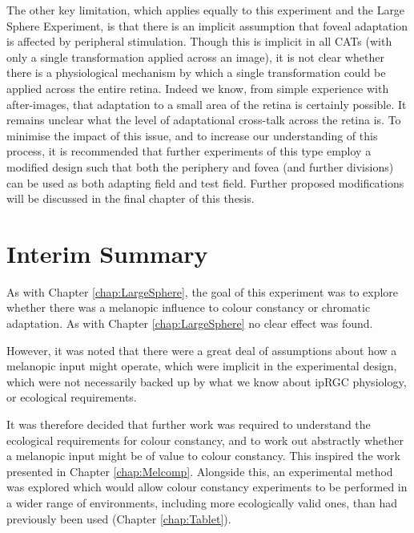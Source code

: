 The other key limitation, which applies equally to this experiment and the Large Sphere Experiment, is that there is an implicit assumption that foveal adaptation is affected by peripheral stimulation. Though this is implicit in all \glspl{CAT} (with only a single transformation applied across an image), it is not clear whether there is a physiological mechanism by which a single transformation could be applied across the entire retina. Indeed we know, from simple experience with after-images, that adaptation to a small area of the retina is certainly possible. It remains unclear what the level of adaptational cross-talk across the retina is. To minimise the impact of this issue, and to increase our understanding of this process, it is recommended that further experiments of this type employ a modified design such that both the periphery and fovea (and further divisions) can be used as both adapting field and test field. Further proposed modifications will be discussed in the final chapter of this thesis.

\section{Interim Summary}

As with Chapter \ref{chap:LargeSphere}, the goal of this experiment was to explore whether there was a melanopic influence to colour constancy or chromatic adaptation. As with Chapter \ref{chap:LargeSphere} no clear effect was found.

However, it was noted that there were a great deal of assumptions about how a melanopic input might operate, which were implicit in the experimental design, which were not necessarily backed up by what we know about \gls{ipRGC} physiology, or ecological requirements. 

It was therefore decided that further work was required to understand the ecological requirements for colour constancy, and to work out abstractly whether a melanopic input might be of value to colour constancy. This inspired the work presented in Chapter \ref{chap:Melcomp}. Alongside this, an experimental method was explored which would allow colour constancy experiments to be performed in a wider range of environments, including more ecologically valid ones, than had previously been used (Chapter \ref{chap:Tablet}).
